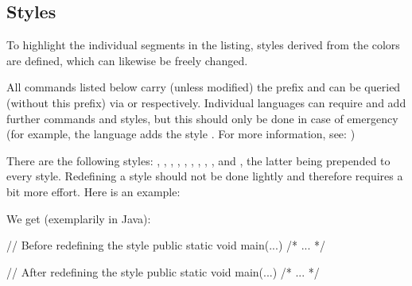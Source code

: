 \documentclass{sopra-base}
\begin{document}
\subsection{Styles}
    To highlight the individual segments in the listing, styles derived from the colors are defined, which can likewise be freely changed. \par{}
    All commands listed below carry (unless modified) the prefix
     and can be queried (without this prefix) via  or  respectively. Individual languages can
    require and add further commands and styles, but this should only be done in case of emergency (for example, the language  adds the style . For more information, see: )\par{}
    There are the following styles: , , , , , , , , ,  and , the latter being prepended to every style. Redefining a style should
    not be done lightly and therefore requires a bit more effort. Here is an example:
\begin{plainlatex}[morekeywords={[5]{\\sol@list@define@styles,\\scshape}}]
{\makeatletter
}
\end{plainlatex}
We get (exemplarily in Java):
    \begingroup
\begin{java}
// Before redefining the style
public static void main(...){ /* ... */ }
\end{java}
{\makeatletter
}
\begin{java}
// After redefining the style
public static void main(...){ /* ... */ }
    \end{java}
    \endgroup
{\makeatletter
}
\end{document}
